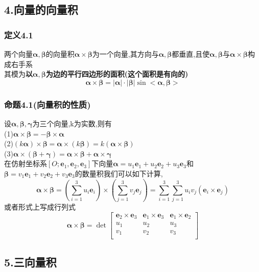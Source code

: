 \documentclass{article}
\newcommand{\ve}{\boldsymbol}
\begin{document}
\begin{CJK}{UTF8}{gkai}
\subsection*{4.向量的向量积}
\subsubsection*{定义4.1}
两个向量$\ve{\alpha},\ve{\beta}$的向量积$\ve{\alpha}\times\ve{\beta}$为一个向量,其方向与$\ve{\alpha},\ve{\beta}$都垂直,且使$\ve{\alpha},\ve{\beta}$与$\ve{\alpha}\times \ve{\beta}$构成右手系\\
其模为\textbf{以$\ve{\alpha},\ve{\beta}$为边的平行四边形的面积(这个面积是有向的)}\\
\[\ve{\alpha}\times\ve{\beta}=\left|\ve{\alpha}\right|\cdot\left|\ve{\beta}\right|\sin<\ve{\alpha},\ve{\beta}>\]





\subsubsection*{命题4.1(向量积的性质)}
设$\ve{\alpha},\ve{\beta},\ve{\gamma}$为三个向量,k为实数,则有\\
(1)$\ve{\alpha}\times\ve{\beta}=-\ve{\beta}\times\ve{\alpha}$\\
(2)$(k\ve{\alpha})\times\ve{\beta}=\ve{\alpha}\times(k\ve{\beta})=k(\ve{\alpha}\times\ve{\beta})$\\
(3)$\ve{\alpha}\times(\ve{\beta}+\ve{\gamma})=\ve{\alpha}\times\ve{\beta}+\ve{\alpha}\times\ve{\gamma}$\\
在仿射坐标系$[O;\ve{e}_1,\ve{e}_2,\ve{e}_3]$下向量$\ve{\alpha}=u_1\ve{e}_1+u_2\ve{e}_2+u_3\ve{e}_3$和$\ve{\beta}=v_1\ve{e}_1+v_2\ve{e}_2+v_3\ve{e}_3$的数量积我们可以如下计算,\\
\[\ve{\alpha}\times\ve{\beta}=(\sum_{i=1}^3 u_i\ve{e}_i)\times(\sum_{j=1}^3 v_j\ve{e}_j)=\sum_{i=1}^3\sum_{j=1}^3 u_i v_j(\ve{e}_i\times\ve{e}_j)
\]
或者形式上写成行列式\\
\[\ve{\alpha}\times\ve{\beta}=
\det
\begin{bmatrix}
    \ve{e}_2\times\ve{e}_3&\ve{e}_1\times\ve{e}_3&\ve{e}_1\times\ve{e}_2\\
    u_1&u_2&u_3\\
    v_1&v_2&v_3\\    
\end{bmatrix}
\]





\subsection*{5.三向量积}


\end{CJK}
\end{document}
